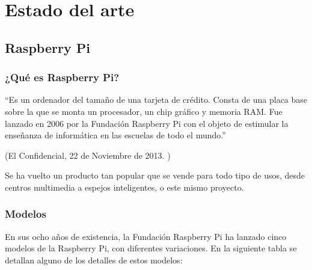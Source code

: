 
\chapter{Estado del arte} %
\label{sec:EstadoDelArte}


    \section{Raspberry Pi} %
    \label{sec:RaspberryPi}

        \subsection{¿Qué es Raspberry Pi?} %
        \label{sub:QueEsRaspberryPi}

            ``Es un ordenador del tamaño de una tarjeta de crédito. Consta de una placa base sobre la que se monta un
            procesador, un chip gráfico y memoria RAM. Fue lanzado en 2006 por la Fundación Raspberry Pi con el objeto
            de estimular la enseñanza de informática en las escuelas de todo el mundo.''

            \begin{flushright}
                (El Confidencial, 22 de Noviembre de 2013. \cite{confidencial_raspberry})
            \end{flushright}

            Se ha vuelto un producto tan popular que se vende para todo tipo de usos, desde centros
            multimedia\cite{centro_multimedia_raspberry_pi} a espejos inteligentes\cite{espejo_raspberry_pi}, o este
            mismo proyecto.
        

        \subsection{Modelos} %
        \label{sub:ModelosRaspberryPi}

            En sus ocho años de existencia, la Fundación Raspberry Pi ha lanzado cinco modelos de la Raspberry Pi, con
            diferentes variaciones. En la siguiente tabla se detallan alguno de los detalles de estos modelos:

